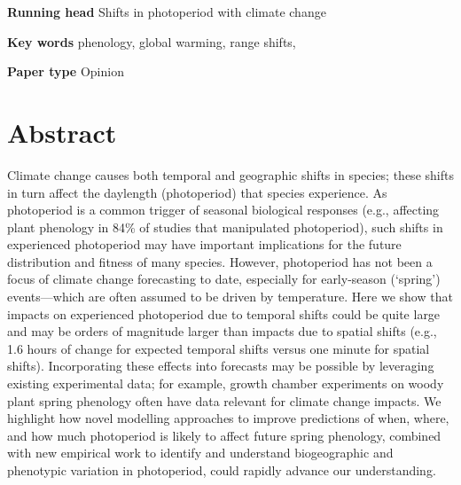 \documentclass{article}
\begin{document}
\textbf{Running head} Shifts in photoperiod with climate change

\textbf{Key words} phenology, global warming, range shifts, 

\textbf{Paper type} Opinion





\section*{Abstract}
Climate change causes both temporal and geographic shifts in species; these shifts in turn affect the daylength (photoperiod) that species experience. As photoperiod is a common trigger of seasonal biological responses (e.g., affecting plant phenology in 84\% of studies that manipulated photoperiod), such shifts in experienced photoperiod may have important implications for the future distribution and fitness of many species. However, photoperiod has not been a focus of climate change forecasting to date, especially for early-season (`spring') events---which are often assumed to be driven by temperature. Here we show that impacts on experienced photoperiod due to temporal shifts could be quite large and may be orders of magnitude larger than impacts due to spatial shifts (e.g., 1.6 hours of change for expected temporal shifts versus one minute for spatial shifts). Incorporating these effects into forecasts may be possible by leveraging existing experimental data; for example, growth chamber experiments on woody plant spring phenology often have data relevant for climate change impacts. We highlight how novel modelling approaches to improve predictions of when, where, and how much photoperiod is likely to affect future spring phenology, combined with new empirical work to identify and understand biogeographic and phenotypic variation in photoperiod, could rapidly advance our understanding. %
\end{document}
